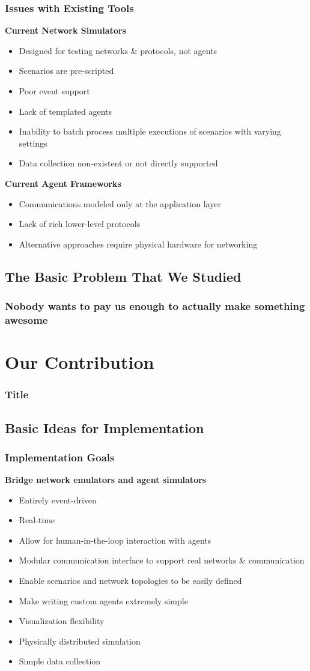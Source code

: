 \documentclass[mathserif]{beamer}
\begin{document}
\frame
{
    \frametitle{Issues with Existing Tools}
    \textbf{Current Network Simulators}
    \begin{itemize}
        \item Designed for testing networks \& protocols, not agents 
        \item Scenarios are pre-scripted
        \item Poor event support
        \item Lack of templated agents
        \item Inability to batch process multiple executions of scenarios with varying settings
        \item Data collection non-existent or not directly supported
    \end{itemize}
    \textbf{Current Agent Frameworks}
    \begin{itemize}
        \item Communications modeled only at the application layer
        \item Lack of rich lower-level protocols
        \item Alternative approaches require physical hardware for networking
    \end{itemize}
}

\subsection{The Basic Problem That We Studied}
\frame
{
    \frametitle{Nobody wants to pay us enough to actually make something awesome}
}

\section{Our Contribution}

\frame
{
    \frametitle{Title}
}

\subsection{Basic Ideas for Implementation}

\frame
{
    \frametitle{Implementation Goals}
    \textbf{Bridge network emulators and agent simulators}
    \begin{itemize}
        \item Entirely event-driven
        \item Real-time
        \item Allow for human-in-the-loop interaction with agents
        \item Modular communication interface to support real networks \& communication
        \item Enable scenarios and network topologies to be easily defined
        \item Make writing custom agents extremely simple
        \item Visualization flexibility
        \item Physically distributed simulation
        \item Simple data collection
    \end{itemize}
}
\end{document}
